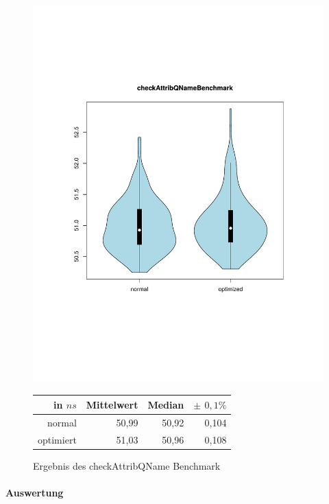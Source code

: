 \begin{figure}[H]
{		\includegraphics[trim=20mm 60mm 0mm 50mm,scale=0.50]{pictures/vioplot_checkAttribQName.pdf}
	}

	\begin{table}[H]
	\centering
		\begin{tabular}{|r|r|r|r|}
			\hline
		   	in $ns$  & Mittelwert & Median & \bf{$\pm$ $0,1\%$} \\
		 	\hline
		 	\hline
		  	normal & 50,99 & 50,92 & 0,104 \\
		 	optimiert & 51,03 & 50,96 & 0,108 \\ 
		  	\hline
		  	
		\end{tabular}
	\end{table}

	\caption{Ergebnis des checkAttribQName Benchmark}\label{bp:checkAttrBench}
\end{figure}

\paragraph{Auswertung}

